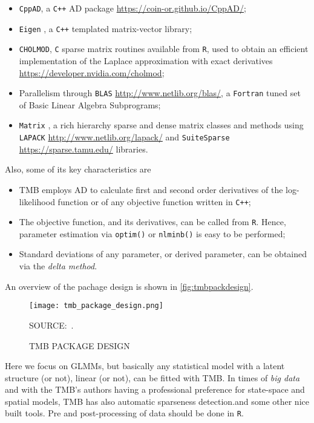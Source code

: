 \begin{itemize}
\item \texttt{CppAD}, a \texttt{C++} AD package
  \url{https://coin-or.github.io/CppAD/};
\item \texttt{Eigen} \cite{eigen}, a \texttt{C++} templated
  matrix-vector library;
\item \texttt{CHOLMOD}, \texttt{C} sparse matrix routines available from
  \texttt{R}, used to obtain an efficient implementation of the Laplace
  approximation with exact derivatives
  \url{https://developer.nvidia.com/cholmod};
\item Parallelism through \texttt{BLAS}
  \url{http://www.netlib.org/blas/}, a \texttt{Fortran} tuned set of
  Basic Linear Algebra Subprograms;
\item \texttt{Matrix} \cite{Matrix}, a rich hierarchy sparse and dense
  matrix classes and methods using \texttt{LAPACK}
  \url{http://www.netlib.org/lapack/} and \texttt{SuiteSparse}
  \url{https://sparse.tamu.edu/} libraries.
\end{itemize}
Also, some of its key characteristics are
\begin{itemize}
\item TMB employs AD to calculate first and second order derivatives of
  the log-likelihood function or of any objective function written in
  \texttt{C++};
\item The objective function, and its derivatives, can be called from
  \texttt{R}. Hence, parameter estimation via \texttt{optim()} or
  \texttt{nlminb()} is easy to be performed;
\item Standard deviations of any parameter, or derived parameter, can be
  obtained via the \textit{delta method}.
\end{itemize}
An overview of the pachage design is shown in
\autoref{fig:tmbpackdesign}.

\begin{figure}[H]
  \setlength{\abovecaptionskip}{.0001pt}
  \caption{TMB PACKAGE DESIGN}
  \vspace{0.35cm} \centering
  \texttt{[image: tmb\_package\_design.png]}
  \\
  \vspace{0.1cm}
  \begin{footnotesize}
    SOURCE:~.
  \end{footnotesize}
  \label{fig:tmbpackdesign}
\end{figure}

Here we focus on GLMMs, but basically any statistical model with a
latent structure (or not), linear (or not), can be fitted with TMB. In
times of \textit{big data} and with the TMB's authors having a
professional preference for state-space and spatial models, TMB has
also automatic sparseness detection.and some other nice built tools. Pre
and post-processing of data should be done in \texttt{R}.

